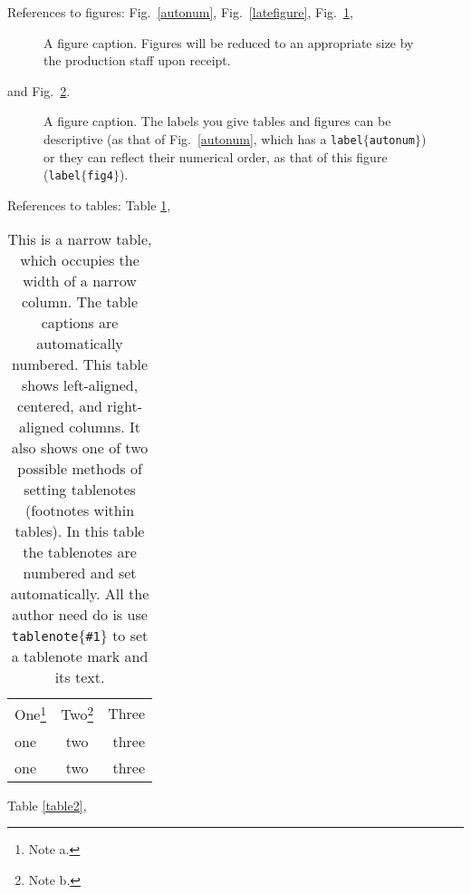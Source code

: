 \documentclass[prb]{revtex4}
\makeatletter
\def\btt#1{\texttt{\@backslashchar#1}}%
\makeatother
\begin{document}
References to figures: Fig.~\ref{autonum}, Fig.~\ref{latefigure},
Fig.~\ref{reduced},%
\begin{figure}
\caption{A figure caption. Figures will be reduced to an appropriate
size by  the production
staff upon receipt.}
\label{reduced}
\end{figure}
and Fig.~\ref{fig4}.%
\begin{figure}
\caption{A figure caption.  The labels you give tables and figures
can be descriptive (as that of Fig.~\ref{autonum}, which has
a  \btt{label}$\{${\tt autonum}$\}$) or they can
reflect their numerical
order, as that of this figure
(\btt{label}$\{${\tt fig4}$\}$).\label{fig4}}
\end{figure}

References to tables:
Table \ref{table1},%
\begin{table}
\caption{This is a narrow table, which
occupies the width of a narrow
column. The table captions are automatically numbered.
This table shows left-aligned, centered, and right-aligned columns. It also
shows one of two possible methods of setting tablenotes (footnotes within
tables). In this table the tablenotes are numbered and set automatically.
All the author need do is use \btt{tablenote$\{$\#1$\}$} to set a tablenote
mark and its text.
\label{table1}}
\begin{tabular}{lcr}
One\footnote{Note a.}&Two\footnote{Note b.}&Three\\
\colrule
one&two&three\\
one&two&three\\
\end{tabular}
\end{table}
Table \ref{table2},%
\end{document}
